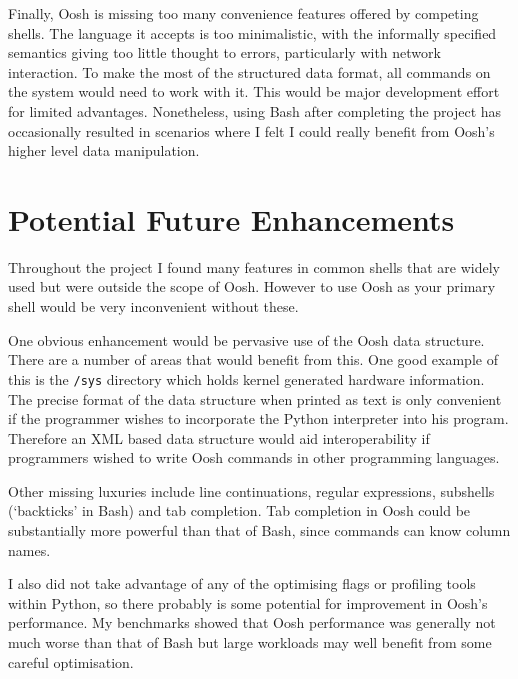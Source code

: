 \documentclass[12pt,twoside,notitlepage]{report}
\begin{document}
Finally, Oosh is missing too many convenience features offered by
competing shells. The language it accepts is too minimalistic, with
the informally specified semantics giving too little thought to
errors, particularly with network interaction. To make the most of the
structured data format, all commands on the system would need to work
with it. This would be major development effort for limited
advantages. Nonetheless, using Bash after completing the project has
occasionally resulted in scenarios where I felt I could really benefit
from Oosh's higher level data manipulation.

\section{Potential Future Enhancements}
Throughout the project I found many features in common shells that are
widely used but were outside the scope of Oosh. However to use Oosh as
your primary shell would be very inconvenient without these.

One obvious enhancement would be pervasive use of the Oosh data
structure. There are a number of areas that would benefit from this.
One good example of this is the {\tt /sys} directory which holds
kernel generated hardware information. The precise format of the data
structure when printed as text is only convenient if the programmer
wishes to incorporate the Python interpreter into his
program. Therefore an XML based data structure would aid
interoperability if programmers wished to write Oosh commands in other
programming languages.

Other missing luxuries include line continuations, regular
expressions, subshells (`backticks' in Bash) and tab completion. Tab
completion in Oosh could be substantially more powerful than that of
Bash, since commands can know column names.

I also did not take advantage of any of the optimising flags or
profiling tools within Python, so there probably is some potential for
improvement in Oosh's performance. My benchmarks showed that Oosh
performance was generally not much worse than that of Bash but large
workloads may well benefit from some careful optimisation.


\cleardoublepage

\end{document}
